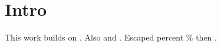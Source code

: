 \section{Intro}
This work \citep[e.g.][]{nested2024} builds on \cite[p.~3]{macro2023}.
Also \citet*{quoted2022} and \cite{plain2020}.
Escaped percent \% then \cite{after_percent}. %
